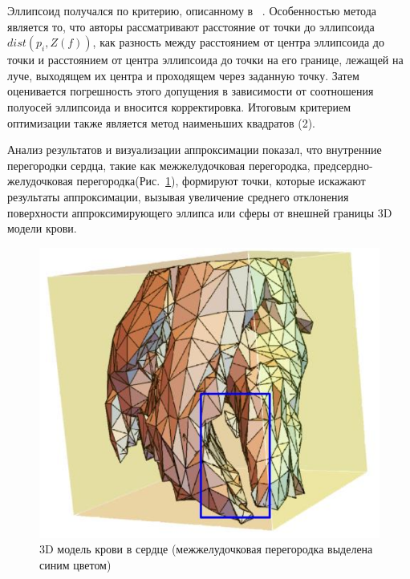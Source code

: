 \documentclass[conference]{IEEEtran}
\begin{document}
Эллипсоид получался по критерию, описанному в ~\cite{Bookstein1979}.
Особенностью метода является то, что авторы рассматривают расстояние от точки до эллипсоида
$dist(p_i,Z(f))$, как разность между расстоянием от центра эллипсоида до точки и расстоянием от центра
эллипсоида до точки на его границе, лежащей на луче, выходящем их центра и проходящем через заданную точку.
Затем оценивается погрешность этого допущения в зависимости от соотношения полуосей эллипсоида и вносится корректировка.
Итоговым критерием оптимизации также является метод наименьших квадратов (2).

Анализ результатов и визуализации аппроксимации показал, что внутренние перегородки сердца, такие как межжелудочковая перегородка,
предсердно-желудочковая перегородка(Рис.~\ref{fig:wall}), формируют точки, которые искажают результаты аппроксимации,
вызывая увеличение среднего отклонения поверхности аппроксимирующего эллипса или сферы от внешней границы 3D модели крови.

\begin{figure}[tbph]
    \centering
    \includegraphics[width=0.8\linewidth]{fig/wall}
    \caption{3D модель крови в сердце (межжелудочковая перегородка выделена синим
    цветом)}
    \label{fig:wall}
\end{figure}
\end{document}
